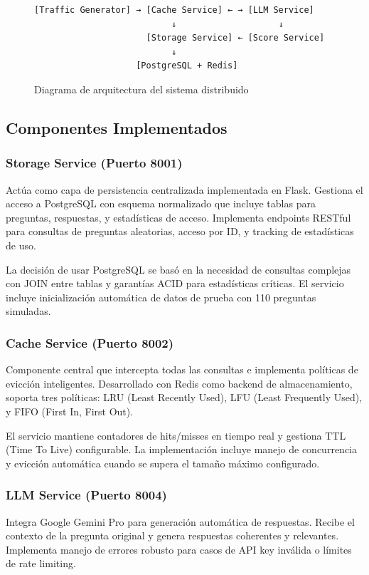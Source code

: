 \documentclass[12pt,a4paper]{article}
\begin{document}
\begin{figure}[H]
\centering
\begin{verbatim}
[Traffic Generator] → [Cache Service] ← → [LLM Service]
                           ↓                    ↓
                      [Storage Service] ← [Score Service]
                           ↓
                    [PostgreSQL + Redis]
\end{verbatim}
\caption{Diagrama de arquitectura del sistema distribuido}
\end{figure}

\subsection{Componentes Implementados}

\subsubsection{Storage Service (Puerto 8001)}
Actúa como capa de persistencia centralizada implementada en Flask. Gestiona el acceso a PostgreSQL con esquema normalizado que incluye tablas para preguntas, respuestas, y estadísticas de acceso. Implementa endpoints RESTful para consultas de preguntas aleatorias, acceso por ID, y tracking de estadísticas de uso.

La decisión de usar PostgreSQL se basó en la necesidad de consultas complejas con JOIN entre tablas y garantías ACID para estadísticas críticas. El servicio incluye inicialización automática de datos de prueba con 110 preguntas simuladas.

\subsubsection{Cache Service (Puerto 8002)}
Componente central que intercepta todas las consultas e implementa políticas de evicción inteligentes. Desarrollado con Redis como backend de almacenamiento, soporta tres políticas: LRU (Least Recently Used), LFU (Least Frequently Used), y FIFO (First In, First Out).

El servicio mantiene contadores de hits/misses en tiempo real y gestiona TTL (Time To Live) configurable. La implementación incluye manejo de concurrencia y evicción automática cuando se supera el tamaño máximo configurado.

\subsubsection{LLM Service (Puerto 8004)}
Integra Google Gemini Pro para generación automática de respuestas. Recibe el contexto de la pregunta original y genera respuestas coherentes y relevantes. Implementa manejo de errores robusto para casos de API key inválida o límites de rate limiting.
\end{document}

